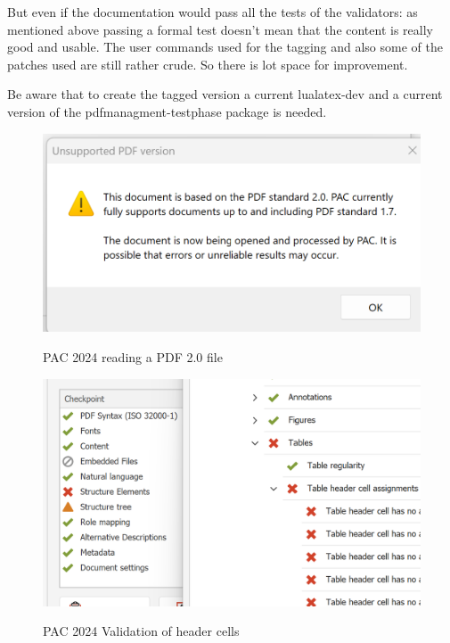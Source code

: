 \documentclass[bibliography=totoc,a4paper]{article}
\begin{document}
But even if the documentation would pass all the tests of the validators:  as 
mentioned above passing a formal test doesn't mean that the content is really 
good and usable. The user commands used for the tagging and also some of the 
patches used are still rather crude. So there is lot space for improvement. 

\begin{tcolorbox}[]
Be aware that to create the tagged version a current lualatex-dev and a 
current version of the pdfmanagment-testphase package is needed. 
\end{tcolorbox}

\begin{figure}
\includegraphics[alt=Screenshot showing that PAC 2024 doesn't support PDF 2.0]{pac2024-version}
\caption{PAC 2024 reading a PDF 2.0 file}\label{fig:pac-version}
\end{figure}

\begin{figure}
\includegraphics[alt=PAC 2024 complains about table header cells]{pac2024-report}
\caption{PAC 2024 Validation of header cells}\label{fig:pac-validation}
\end{figure}
\end{document}
